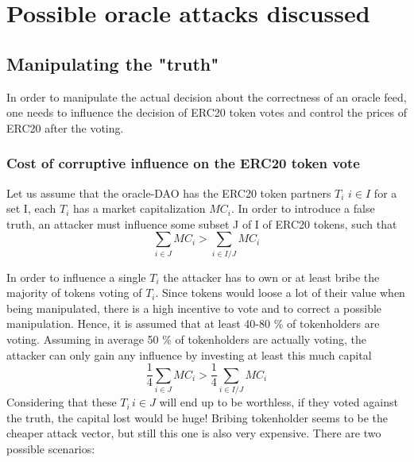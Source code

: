 \documentclass[a4paper]{article}
\begin{document}
\section{Possible oracle attacks discussed}
\subsection{Manipulating the "truth"}
\label{wrongtruth}
In order to manipulate the actual decision about the correctness of an oracle feed, one needs to influence the decision of ERC20 token votes and control the prices of ERC20 after the voting.
\subsubsection*{Cost of corruptive influence on the ERC20 token vote}
Let us assume that the oracle-DAO has the ERC20 token partners $T_i$  $i\in I$ for a set I, each $T_i$ has a market capitalization $MC_i$. In order to introduce a false truth, an attacker must influence some subset J of I of ERC20 tokens, such that $$\sum_{i\in J} MC_i >\sum_{i\in I/J} MC_i $$

In order to influence a single $T_i$ the attacker has to own or at least bribe the majority of tokens voting of $T_i$. Since tokens would loose a lot of their value when being manipulated, there is a high incentive to vote and to correct a possible manipulation. Hence, it is assumed that at least 40-80 \% of tokenholders are voting.
Assuming in average 50 \% of tokenholders are actually voting, the attacker can only gain any influence by investing at least this much capital$$ \label{decisionformula}
\frac{1}{4}\sum_{i\in J} MC_i >\frac{1}{4}\sum_{i\in I/J} MC_i $$
Considering that these $T_i \, i\in J$ will end up to be worthless, if they voted against the truth, the capital lost would be huge!
Bribing tokenholder seems to be the cheaper attack vector, but still this one is also very expensive. There are two possible scenarios:
\end{document}
